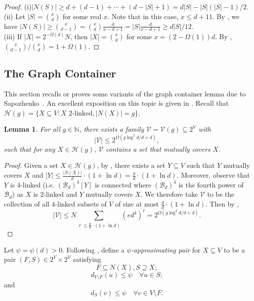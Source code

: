 \documentclass{amsart}
\newtheorem{lem}[thm]{Lemma}
\theoremstyle{definition}
\newcommand{\gO}{\Omega}
\newcommand{\cB}{\mathcal{B} }
\newcommand{\cH}{\mathcal{H} }
\newcommand{\beq}[1]{\begin{equation}\label{#1}}
\newcommand{\enq}[0]{\end{equation}}
\newcommand{\sub}[0]{\subseteq}
\newcommand{\0}[0]{\emptyset}
\begin{document}
\begin{proof} 
(i)$|N(S)|\geq d + (d-1)+\cdots + (d - |S|+1)=d|S| - |S|(|S|-1)/2$.\\
(ii) Let $|S|=\binom{x}{d}$ for some real $x$. Note that in this case, $x\leq d +11$. By , we have 
$|N(S)|\geq \binom{x}{d-1}=\binom{x}{d}\frac{d}{x-d+1}=|S|\frac{d}{x-d+1}\geq d|S|/12$.
\\
(iii) If $|X|=2^{-\gO(d)}N$, then $|X|={x \choose d}$ for some $x=(2-\gO(1))d$. By , ${x \choose d-1}/{x \choose d}=1+\gO(1)$.
\end{proof}



\subsection{The Graph Container}\label{subsec.graph container}

This section recalls or proves some variants of the graph container lemma due to Sapozhenko~\cite{Sap87}. An excellent exposition on this topic is given in \cite{GS}. Recall that $\cH(g)=\{X \sub V: X \mbox{ 2-linked}, |N(X)|=g\}$. 

\begin{lem}\label{lem:contain1}
For all $g\in\mathbb{N}$, there exists a family $\mathcal{V}=\mathcal{V}(g)\subseteq 2^V$ with 
\[
|\mathcal{V}|\leq 2^{\gO(g \log^2 d/d + d)},
\]
such that for any $X\in\cH(g)$, $\mathcal{V}$ contains a set that mutually covers $X$.
\end{lem}
\begin{proof}
Given a set $X\in\cH(g)$, by , there exists a  set $Y\subseteq V$ such that $Y$ mutually covers $X$ and $|Y|\leq \frac{|N(X)|}{d}\cdot (1 + \ln d)=\frac{g}{d}\cdot (1 + \ln d)$. Moreover, observe that $Y$ is 4-linked (i.e. $(\cB_d)^4[Y]$ is connected where $(\cB_d)^4$ is the fourth power of $\cB_d$) as $X$ is 2-linked and $Y$ mutually covers $X$.
We therefore take $\mathcal{V}$ to be the collection of all $4$-linked subsets of $V$ of size at most $\frac{g}{d}\cdot (1 + \ln d)$.
Then by ,
\[
|\mathcal{V}|\leq N\sum_{\ell\leq\frac{g}{d}\cdot (1 + \ln d)}(ed^4)^{\ell}=2^{O(g\log^2 d/d + d)}.
\]
\end{proof}

Let $\psi=\psi(d)>0$. Following \cite{GS, JK}, define a \textit{$\psi$-approximating pair} for $X \sub V$ to be a pair $(F,S) \in 2^V \times 2^V$ satisfying
\beq{approx1} F \sub N(X), S \supseteq X;\enq
\beq{approx2} d_{V \setminus F} (u) \le \psi \quad \forall u \in S;\enq
and
\beq{approx3} d_S(v) \le \psi \quad \forall v \in V \setminus F.\enq
\end{document}
